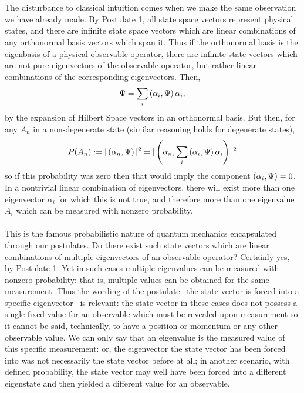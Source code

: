 \\\\
The disturbance to classical intuition comes when we make the same observation we have already made. By Postulate 1, all state space vectors represent physical states, and there are infinite state space vectors which are linear combinations of any orthonormal basis vectors which span it. Thus if the orthonormal basis is the eigenbasis of a physical observable operator, there are infinite state vectors which are not pure eigenvectors of the observable operator, but rather linear combinations of the corresponding eigenvectors. Then,
$$
\Psi=\sum_{i}\left(\alpha_{i},\Psi\right)\alpha_{i},
$$
by the expansion of Hilbert Space vectors in an orthonormal basis. But then, for any $A_{n}$ in a non-degenerate state (similar reasoning holds for degenerate states),
$$
\begin{aligned}
P(A_{n}):=|\left(\alpha_{n},\Psi\right)|^2=|\left(\alpha_{n},\sum_{i}\left(\alpha_{i},\Psi\right)\alpha_{i}\right)|^2
\end{aligned}
$$
so if this probability was zero then that would imply the component $\left(\alpha_{i},\Psi\right)=0$. In a nontrivial linear combination of eigenvectors, there will exist more than one eigenvector $\alpha_{i}$ for which this is not true, and therefore more than one eigenvalue $A_{i}$ which can be measured with nonzero probability.
\\\\
This is the famous probabilistic nature of quantum mechanics encapsulated through our postulates. Do there exist such state vectors which are linear combinations of multiple eigenvectors of an observable operator? Certainly yes, by Postulate 1. Yet in such cases multiple eigenvalues can be measured with nonzero probability: that is, multiple values can be obtained for the same measurement. Thus the wording of the postulate-- the state vector is forced into a specific eigenvector-- is relevant: the state vector in these cases does not possess a single fixed value for an observable which must be revealed upon measurement so it cannot be said, technically, to have a position or momentum or any other observable value. We can only say that an eigenvalue is the measured value of this specific measurement: or, the eigenvector the state vector has been forced into was not necessarily the state vector before at all; in another scenario, with defined probability, the state vector may well have been forced into a different eigenstate and then yielded a different value for an observable. 
\\\\

